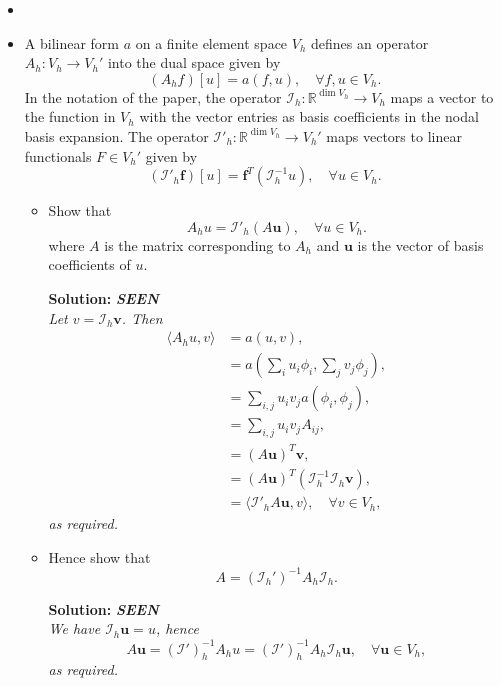\documentclass[12pt]{article}
\newcommand{\seen}{{\bfseries SEEN\\}}
\newcommand{\exammarks}[1]{\begin{flushright}[#1 marks]\end{flushright}}%
\def\MM#1{\boldsymbol{#1}}
\newcommand{\soln}[1]{{\bfseries Solution:} {\itshape \color{blue} #1}}
\newcommand{\soln}[1]{}
\newenvironment{Question}[1] 
 {\begin{itemize} \item[\large #1.~~]}{\end{itemize} \medskip}
\newcommand{\BeginParts}{\begin{itemize}}
\newcommand{\Part}[1]{\item [(#1)~~]}
\newcommand{\EndParts}{\end{itemize}}
\begin{document}
\begin{Question}{5}
   \Part{b} A bilinear form $a$ on a finite element space $V_h$ defines
   an operator $A_h:V_h\to V_h'$ into the dual space given by
   \begin{equation}
     (A_h f)[u] = a(f,u), \quad \forall f,u \in V_h.
   \end{equation}
   In the notation of the paper, the operator
   $\mathcal{I}_h:\mathbb{R}^{\dim V_h} \to V_h$ maps a vector to the
   function in $V_h$ with the vector entries as basis coefficients in
   the nodal basis expansion. The operator
   $\mathcal{I}'_h:\mathbb{R}^{\dim V_h} \to V_h'$ maps vectors to
   linear functionals $F \in V_h'$ given by
   \begin{equation}
     (\mathcal{I}'_h\MM{f})[u] = \MM{f}^T(\mathcal{I}^{-1}_hu),
     \quad \forall u \in V_h.
   \end{equation}
   \BeginParts
   \Part{i}
   Show that
   \begin{equation}
     A_h u = \mathcal{I}'_h(A\MM{u}), \quad \forall u \in V_h.
   \end{equation}
   where $A$ is the matrix corresponding to $A_h$ and
   $\MM{u}$ is the vector of basis coefficients of $u$.
   \exammarks{4}
   \soln{\seen
     Let $v=\mathcal{I}_h\MM{v}$. Then
     \begin{align*}
       \langle A_hu, v\rangle & = a(u,v), \\
       &= a\left( \sum_i u_i \phi_i, \sum_j v_j\phi_j\right), \\
       &= \sum_{i,j} u_iv_j a(\phi_i,\phi_j), \\
       &= \sum_{i,j} u_iv_j A_{ij}, \\
       &= (A\MM{u})^T\MM{v}, \\
       &= (A\MM{u})^T(\mathcal{I}_h^{-1}\mathcal{I}_h\MM{v}), \\
       &= \langle \mathcal{I}'_hA\MM{u},v \rangle, \quad
       \forall v \in V_h,
     \end{align*}
     as required.
   }
   \Part{ii} Hence show that
   \begin{equation}
     A = (\mathcal{I}_h')^{-1}A_h \mathcal{I}_h.
   \end{equation}
   \exammarks{3}
   \soln{\seen
     We have $\mathcal{I}_h\MM{u}=u$, hence
     \[
     A\MM{u} = (\mathcal{I}')_h^{-1}A_hu = (\mathcal{I}')_h^{-1}A_h\mathcal{I}_h\MM{u},
     \quad \forall \MM{u} \in V_h,
     \]
     as required.
   }
   \EndParts


\end{Question}
\end{document}
